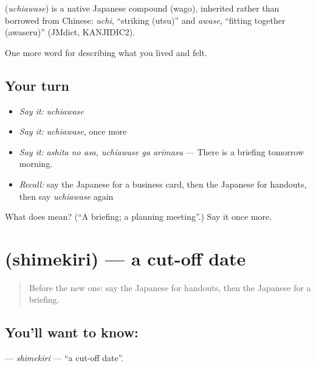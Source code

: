 \begin{cousinweb}
\textbf{} (\emph{uchiawase}) is a native Japanese compound (wago), inherited rather than borrowed from Chinese: \emph{uchi}, \textquotedblleft{}striking (utsu)\textquotedblright{} and \emph{awase}, \textquotedblleft{}fitting together (awaseru)\textquotedblright{} (JMdict, KANJIDIC2).
\end{cousinweb}

\begin{grammarlens}[title={What you've built}]
One more word for describing what you lived and felt.
\end{grammarlens}

\subsection*{Your turn}
\begin{itemize}
\raggedright
  \item \emph{Say it:} \emph{uchiawase}
  \item \emph{Say it:} \emph{uchiawase}, once more
  \item \emph{Say it:} \emph{ashita no asa, uchiawase ga arimasu} — There is a briefing tomorrow morning.
  \item \emph{Recall:} say the Japanese for a business card, then the Japanese for handouts, then say \emph{uchiawase} again
\end{itemize}

\begin{tcolorbox}[breakable,colback=teal!4,colframe=teal!35!black,title={Before you move on}]
What does  mean? (\textquotedblleft{}A briefing; a planning meeting\textquotedblright{}.) Say it once more.
\end{tcolorbox}
\section[\texorpdfstring{\ja{しめきり} (shimekiri)}{しめきり (shimekiri)}]{ (shimekiri) — a cut-off date}

\label{lesson:JA-C453-shimekiri}



\begin{quote}
Before the new one: say the Japanese for handouts, then the Japanese for a briefing.
\end{quote}

\subsection*{You'll want to know: }
\textbf{} — \emph{shimekiri} — \textquotedblleft{}a cut-off date\textquotedblright{}.

